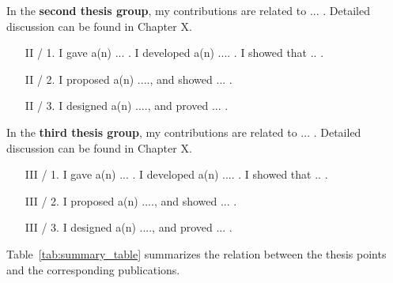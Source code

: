 \documentclass[12pt,a4paper]{extarticle}
\begin{document}
\vspace*{1em}
\noindent

In the \textbf {second thesis group}, my contributions are related to ... . Detailed discussion can be found in Chapter X.
\vspace*{1em}
\begin{enumerate}[wide = 0pt, widest = {II/5.}, leftmargin =*]
    \item [II / 1.] I gave a(n) ... . I developed a(n) .... . 
    I showed that .. .
    
    \item [II / 2.] I proposed a(n) ...., and showed ... .
    
    \item [II / 3.] I designed a(n) ...., and proved ... .
\end{enumerate}

\vspace*{1em}
\noindent

In the \textbf {third thesis group}, my contributions are related to ... . Detailed discussion can be found in Chapter X.

\begin{enumerate}[wide = 0pt, widest = {III/5.}, leftmargin =*]
    \item [III / 1.] I gave a(n) ... . I developed a(n) .... . 
    I showed that .. .
    
    \item [III / 2.] I proposed a(n) ...., and showed ... .
    
    \item [III / 3.] I designed a(n) ...., and proved ... .
\end{enumerate}

\vspace*{1em}
\noindent
Table~\ref{tab:summary_table} summarizes the relation between the thesis points and the corresponding publications.
\vspace*{2em}
\end{document}

